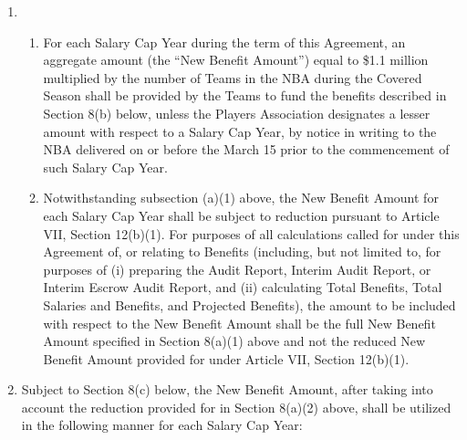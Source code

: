 \documentclass[
]{book}
\providecommand{\tightlist}{%
  \setlength{\itemsep}{0pt}\setlength{\parskip}{0pt}}
\begin{document}
\begin{enumerate}
\def\labelenumi{(\alph{enumi})}
\item
  \begin{enumerate}
  \def\labelenumii{(\arabic{enumii})}
  \tightlist
  \item
    For each Salary Cap Year during the term of this Agreement, an aggregate amount (the ``New Benefit Amount'') equal to \$1.1 million multiplied by the number of Teams in the NBA during the Covered Season shall be provided by the Teams to fund the benefits described in Section 8(b) below, unless the Players Association designates a lesser amount with respect to a Salary Cap Year, by notice in writing to the NBA delivered on or before the March 15 prior to the commencement of such Salary Cap Year.
  \item
    Notwithstanding subsection (a)(1) above, the New Benefit Amount for each Salary Cap Year shall be subject to reduction pursuant to Article VII, Section 12(b)(1). For purposes of all calculations called for under this Agreement of, or relating to Benefits (including, but not limited to, for purposes of (i) preparing the Audit Report, Interim Audit Report, or Interim Escrow Audit Report, and (ii) calculating Total Benefits, Total Salaries and Benefits, and Projected Benefits), the amount to be included with respect to the New Benefit Amount shall be the full New Benefit Amount specified in Section 8(a)(1) above and not the reduced New Benefit Amount provided for under Article VII, Section 12(b)(1).
  \end{enumerate}
\item
  Subject to Section 8(c) below, the New Benefit Amount, after taking into account the reduction provided for in Section 8(a)(2) above, shall be utilized in the following manner for each Salary Cap Year:


\end{enumerate}
\end{document}
